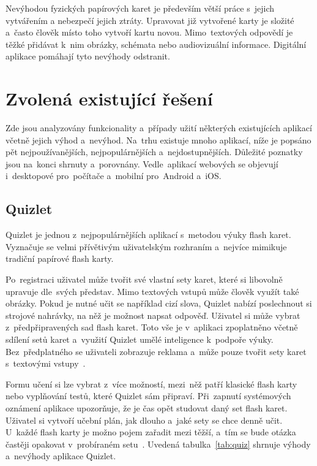 \documentclass[twoside]{ctuthesis}
\begin{document}
Nevýhodou fyzických papírových karet je především větší práce s~jejich vytvářením a nebezpečí jejich ztráty. Upravovat již vytvořené karty je složité a~často člověk místo toho vytvoří kartu novou. Mimo~textových odpovědí je těžké přidávat k~nim obrázky, schémata nebo audiovizuální informace. Digitální aplikace pomáhají tyto nevýhody odstranit.

\renewcommand{\arraystretch}{1.5}

\section{Zvolená existující řešení}

Zde jsou analyzovány funkcionality a~případy užití některých existujících aplikací včetně jejich výhod a~nevýhod. Na~trhu existuje mnoho aplikací, níže je popsáno pět nejpoužívanějších, nejpopulárnějších a~nejdostupnějších. Důležité poznatky jsou na~konci shrnuty a~porovnány. Vedle~aplikací webových se objevují i~desktopové pro~počítače a~mobilní pro~Android a~iOS.

\subsection{Quizlet}

Quizlet je jednou z~nejpopulárnějších aplikací s~metodou výuky flash karet. Vyznačuje se velmi přívětivým uživatelským rozhraním a~nejvíce mimikuje tradiční papírové flash karty.

Po~registraci uživatel může tvořit své vlastní sety karet, které si libovolně upravuje dle~svých představ. Mimo textových vstupů může člověk využít také obrázky. Pokud je nutné učit se například cizí slova, Quizlet nabízí poslechnout si strojové nahrávky, na něž je možnost napsat odpověď. Uživatel si může vybrat z~předpřipravených sad flash karet. Toto vše je v~aplikaci zpoplatněno včetně sdílení setů karet a~využití Quizlet umělé inteligence k~podpoře výuky. Bez~předplatného se uživateli zobrazuje reklama a~může pouze tvořit sety karet s~textovými vstupy~\cite{tsay, ransom}.

\newpage

Formu učení si lze vybrat z~více možností, mezi~něž patří klasické flash karty nebo vyplňování testů, které Quizlet sám připraví. Při~zapnutí systémových oznámení aplikace upozorňuje, že je čas opět studovat daný set flash karet. Uživatel si vytvoří učební plán, jak dlouho a~jaké sety se chce denně učit. U~každé flash karty je možno pojem zařadit mezi těžší, a~tím se bude otázka častěji opakovat v~probíraném setu~\cite{quizlet}. Uvedená tabulka~\ref{tab:quiz} shrnuje výhody a~nevýhody aplikace Quizlet.
\end{document}
